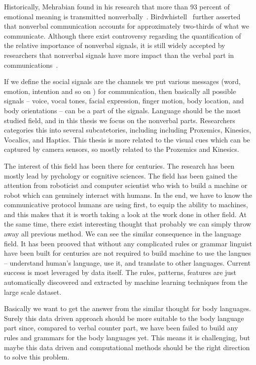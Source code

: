 Historically, Mehrabian found in his research that more than 93 percent of emotional meaning is transmitted nonverbally~\cite{Mehrabian67,Mehrabian81}. Birdwhistell~\cite{Birdwhistell70} further asserted that nonverbal communication accounts for approximately two-thirds of what we communicate. Although there exist controversy regarding the quantification of the relative importance of nonverbal signals, it is still widely accepted by researchers that nonverbal signals have more impact than the verbal part in communications~\cite{Moore13}.





If we define the social signals are the channels we put various messages (word, emotion, intention and so on ) for communication, then basically all possible signals -- voice, vocal tones, facial expression, finger motion, body location, and body orientations -- can be a part of the signals.   Language should be the most studied field, and in this thesis we focus on the nonverbal parts. Researchers categories this into several subcatetories, including including Proxemics, Kinesics, Vocalics, and Haptics. This thesis is more related to the visual cues which can be captured by camera sensors, so mostly related to the Proxemics and Kinesics. 

The interest of this field has been there for centuries. The research has been mostly lead by pychology or cognitive sciences. The field has been gained the attention from roboticist and computer scientist who wish to build a machine or robot which can genuinely interact with humans.  In the end, we have to know the communicative protocol humans are using first, to equip the ability to machines, and this makes that it is worth taking a look at the work done in other field. At the same time, there exist interesting thought that probably we can simply throw away all previous method. We can see the similar consequence in the language field. It has been prooved that without any complicated rules or grammar linguist have been built for centuries are not required to build machine to use the langues -- understand human's language, use it, and translate to other languages. Current success is most leveraged by data itself. The rules, patterns, features are just automatically discovered and extracted by machine learning techniques from the large scale dataset. 

Basically we want to get the answer from the similar thought for body languages. Surely this data driven approach should be more suitable to the body language part since, compared to verbal counter part, we have been failed to build any rules and grammars for the body languages yet. This means it is challenging, but maybe this data driven and computational methods should be the right direction to solve this problem. 

